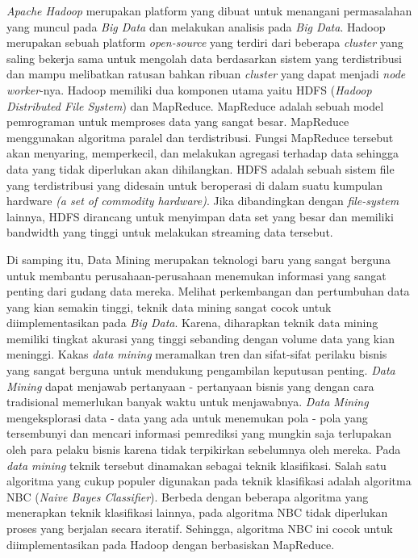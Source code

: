 \textit{Apache Hadoop} merupakan platform yang dibuat untuk menangani permasalahan yang muncul pada \textit{Big Data} dan melakukan analisis pada \textit{Big Data}. Hadoop merupakan sebuah platform \textit{open-source} yang terdiri dari beberapa \textit{cluster} yang saling bekerja sama untuk mengolah data berdasarkan sistem yang terdistribusi dan mampu melibatkan ratusan bahkan ribuan \textit{cluster} yang dapat menjadi \textit{node} \textit{worker}-nya. Hadoop memiliki dua komponen utama yaitu HDFS (\textit{Hadoop Distributed File System}) dan MapReduce. MapReduce adalah sebuah model pemrograman untuk memproses data yang sangat besar.
MapReduce menggunakan algoritma paralel dan terdistribusi. Fungsi MapReduce tersebut akan menyaring, memperkecil, dan melakukan agregasi terhadap data sehingga data yang tidak diperlukan akan dihilangkan. HDFS adalah sebuah sistem file yang terdistribusi yang didesain untuk beroperasi di dalam suatu kumpulan hardware \textit{(a set of commodity hardware)}. Jika dibandingkan dengan \textit{file-system} lainnya, HDFS dirancang untuk menyimpan data set yang besar dan memiliki bandwidth yang tinggi untuk melakukan streaming data tersebut.


Di samping itu, Data Mining merupakan teknologi baru yang sangat berguna untuk membantu perusahaan-perusahaan menemukan informasi yang sangat penting dari gudang data mereka. Melihat perkembangan dan pertumbuhan data yang kian semakin tinggi, teknik data mining sangat cocok untuk diimplementasikan pada \textit{Big Data}. Karena, diharapkan teknik data mining memiliki tingkat akurasi yang tinggi sebanding dengan volume data yang kian meninggi. Kakas \textit{data mining} meramalkan tren dan sifat-sifat perilaku bisnis yang sangat berguna untuk mendukung pengambilan keputusan penting. \textit{Data Mining} dapat menjawab pertanyaan - pertanyaan bisnis yang dengan cara tradisional memerlukan banyak waktu untuk menjawabnya. \textit{Data Mining} mengeksplorasi data - data yang ada untuk menemukan pola - pola yang tersembunyi dan mencari informasi pemrediksi yang mungkin saja terlupakan oleh para pelaku bisnis karena tidak terpikirkan sebelumnya oleh mereka. Pada \textit{data mining} teknik tersebut dinamakan sebagai teknik klasifikasi. Salah satu algoritma yang cukup populer digunakan pada teknik klasifikasi adalah algoritma NBC (\textit{Naive Bayes Classifier}). Berbeda dengan beberapa algoritma yang menerapkan teknik klasifikasi lainnya, pada algoritma NBC tidak diperlukan proses yang berjalan secara iteratif. Sehingga, algoritma NBC ini cocok untuk diimplementasikan pada Hadoop dengan berbasiskan MapReduce.

